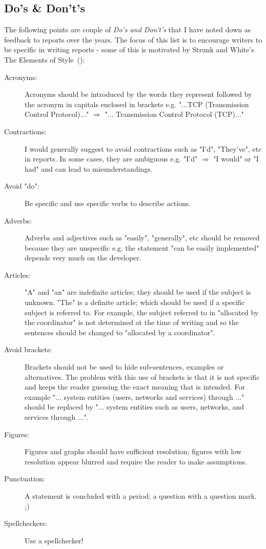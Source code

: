\documentclass{article}
\begin{document}
\subsection{Do's \& Don't's}
\label{sec:DosAndDonts}

The following points are couple of {\it Do's and Don't's} that I have noted down as feedback to reports over the years. The focus of this list is to encourage writers to be specific in writing reports - some of this is motivated by Strunk and White's The Elements of Style~(\cite{strunk}):

\begin{description}
	\item [Acronyms:] Acronyms should be introduced by the words they represent followed by the acronym in capitals enclosed in brackets e.g. "...TCP (Transmission Control Protocol)..." $\Rightarrow$  "... Transmission Control Protocol (TCP)..."
	\item [Contractions:] I would generally suggest to avoid contractions such as "I'd", "They've", etc in reports. In some cases, they are ambiguous e.g. "I'd" $\Rightarrow$ "I would" or "I had" and can lead to misunderstandings.
	\item [Avoid "do":] Be specific and use specific verbs to describe actions.
	\item [Adverbs:] Adverbs and adjectives such as "easily", "generally", etc should be removed because they are unspecific e.g. the statement "can be easily implemented" depends very much on the developer. 
	\item [Articles:] "A" and "an" are indefinite articles; they should be used if the subject is unknown. "The" is a definite article; which should be used if a specific subject is referred to. For example, the subject referred to in "allocated by the coordinator" is not determined at the time of writing and so the sentences should be changed to "allocated by a coordinator".
	\item [Avoid brackets:] Brackets should not be used to hide sub-sentences, examples or alternatives. The problem with this use of brackets is that it is not specific and keeps the reader guessing the exact meaning that is intended. For example "... system entities (users, networks and services) through ..." should be replaced by "... system entities such as users, networks, and services through ...".
	\item [Figures:] Figures and graphs should have sufficient resolution; figures with low resolution appear blurred and require the reader to make assumptions.
	\item [Punctuation:] A statement is concluded with a period; a question with a question mark. ;) 
	\item [Spellcheckers:] Use a spellchecker!
\end{description}



%

 
\end{document}
